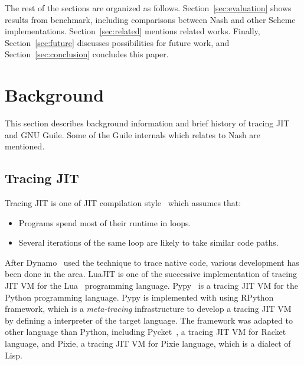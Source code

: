 \documentclass[preprint, 10pt]{sigplanconf}
\begin{document}
The rest of the sections are organized as follows.
Section~\hyperref[sec:evaluation]{\ref{sec:evaluation}} shows results from
benchmark, including comparisons between Nash and other Scheme
implementations. Section~\hyperref[sec:related]{\ref{sec:related}} mentions
related works. Finally, Section~\hyperref[sec:conclusion]{\ref{sec:future}}
discusses possibilities for future work, and
Section~\hyperref[sec:conclusion]{\ref{sec:conclusion}} concludes this paper.

\section{Background}
\label{sec:background}

This section describes background information and brief history of tracing JIT
and GNU Guile. Some of the Guile internals which relates to Nash are
mentioned.

\subsection{Tracing JIT}
Tracing JIT is one of JIT compilation style~\cite{bolz2009tracing} which
assumes that:

\begin{itemize}
\item Programs spend most of their runtime in loops.
\item Several iterations of the same loop are likely to take similar code
  paths.
\end{itemize}

After Dynamo~\cite{bala2000dynamo} used the technique to trace native code,
various development has been done in the area. LuaJIT is one of the successive
implementation of tracing JIT VM for the Lua~\cite{ierusalimschy1996lua}
programming language. Pypy~\cite{bolz2009tracing} is a tracing JIT VM for the
Python programming language. Pypy is implemented with using
RPython~\cite{bolz2009tracing} framework, which is a \textit{meta-tracing}
infrastructure to develop a tracing JIT VM by defining a interpreter of the
target language. The framework was adapted to other language than Python,
including Pycket~\citep{bauman2015pycket}, a tracing JIT VM for Racket
language, and Pixie, a tracing JIT VM for Pixie language, which is a dialect
of Lisp.
\end{document}
